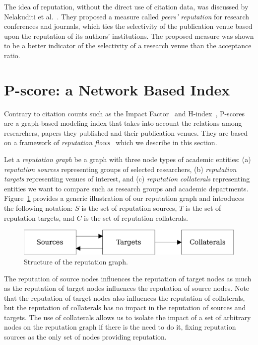 \documentclass[notitlepage]{svjour3}
\begin{document}
The idea of reputation, without the direct use of citation data, was discussed by Nelakuditi et al.~\cite{Nelakuditi2011}. 
They proposed a measure called \textit{peers' reputation} for 
research conferences and journals, which ties the selectivity of the publication venue based upon 
the reputation of its authors' institutions. The proposed measure was shown to be a better indicator 
of the selectivity of a research venue than the acceptance ratio.

\section{P-score: a Network Based Index} 
\label{pscore} 

Contrary to citation counts such as the Impact 
Factor~\cite{Garfield1955a,Saha2003,Thomson2017,Balaban2012} and 
H-index~\cite{Benevenuto2016,Bar-Ilan2008,Egghe2008,Bornmann2005,Bornmann2011}, 
P-scores are a graph-based modeling index that takes into account 
the relations among researchers, papers they published and their publication venues. They are based on a framework of \textit{reputation flows}~\cite{Ribas2015} which we describe in this section.

Let a \emph{reputation graph} be a graph with three node types of academic entities: (a) {\em reputation sources} representing groups of selected researchers, 
(b) {\em reputation targets} representing venues of interest, and
(c) {\em reputation collaterals} representing entities we want to compare such as research groups and academic 
departments. 
Figure~\ref{fig:overview} provides a generic illustration of our reputation graph and introduces the following 
notation: $S$ is the set of reputation sources, $T$ is the set of reputation targets, and $C$ is the set of reputation collaterals.

\begin{figure}[ht]
   \centerline{\includegraphics[scale=0.6]{figures/overview-line}}
   \caption{Structure of the reputation graph.}
   \label{fig:overview}
\end{figure}

The reputation of source nodes influences the reputation
of target nodes as much as the reputation of target nodes
influences the reputation of source nodes. Note that the
reputation of target nodes also influences the reputation of
collaterals, but the reputation of collaterals has no impact
in the reputation of sources and targets. The use of collaterals
allows us to isolate the impact of a set of arbitrary
nodes on the reputation graph if there is the need to do it, 
fixing reputation sources as the only set of nodes providing reputation. 
\end{document}
